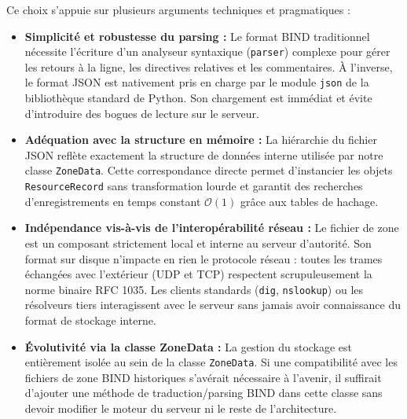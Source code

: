 Ce choix s'appuie sur plusieurs arguments techniques et pragmatiques :
\begin{itemize}
    \item \textbf{Simplicité et robustesse du parsing :} Le format BIND traditionnel nécessite l'écriture d'un analyseur syntaxique (\texttt{parser}) complexe pour gérer les retours à la ligne, les directives relatives et les commentaires. À l'inverse, le format JSON est nativement pris en charge par le module \texttt{json} de la bibliothèque standard de Python. Son chargement est immédiat et évite d'introduire des bogues de lecture sur le serveur.
    \item \textbf{Adéquation avec la structure en mémoire :} La hiérarchie du fichier JSON reflète exactement la structure de données interne utilisée par notre classe \texttt{ZoneData}. Cette correspondance directe permet d'instancier les objets \texttt{ResourceRecord} sans transformation lourde et garantit des recherches d'enregistrements en temps constant $\mathcal{O}(1)$ grâce aux tables de hachage.
    \item \textbf{Indépendance vis-à-vis de l'interopérabilité réseau :} Le fichier de zone est un composant strictement local et interne au serveur d'autorité. Son format sur disque n'impacte en rien le protocole réseau : toutes les trames échangées avec l'extérieur (UDP et TCP) respectent scrupuleusement la norme binaire RFC 1035. Les clients standards (\texttt{dig}, \texttt{nslookup}) ou les résolveurs tiers interagissent avec le serveur sans jamais avoir connaissance du format de stockage interne.
    \item \textbf{Évolutivité via la classe ZoneData :} La gestion du stockage est entièrement isolée au sein de la classe \texttt{ZoneData}. Si une compatibilité avec les fichiers de zone BIND historiques s'avérait nécessaire à l'avenir, il suffirait d'ajouter une méthode de traduction/parsing BIND dans cette classe sans devoir modifier le moteur du serveur ni le reste de l'architecture.
\end{itemize}

